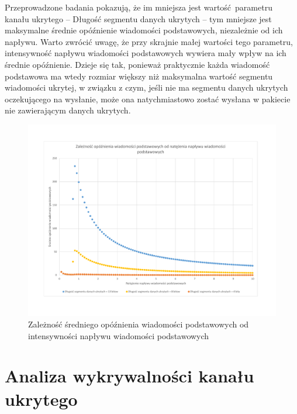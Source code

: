 \documentclass[a4paper, twoside, 12pt]{report}
\begin{document}
            Przeprowadzone badania pokazują, że im mniejsza jest wartość parametru
            kanału ukrytego -- Długość segmentu danych ukrytych -- tym mniejsze
            jest maksymalne średnie opóźnienie wiadomości podstawowych, niezależnie
            od ich napływu. Warto zwrócić uwagę, że przy skrajnie małej wartości tego
            parametru, intensywność napływu wiadomości podstawowych wywiera mały
            wpływ na ich średnie opóźnienie. Dzieje się tak, ponieważ praktycznie
            każda wiadomość podstawowa ma wtedy rozmiar większy niż maksymalna wartość
            segmentu wiadomości ukrytej, w związku z czym, jeśli nie ma segmentu
            danych ukrytych oczekującego na wysłanie, może ona natychmiastowo
            zostać wysłana w pakiecie nie zawierającym danych ukrytych.

        \begin{figure}[h]
                \centering
                \includegraphics[scale=0.6]{opoznieniepodstawowychodpodstawowych}
                \caption{Zależność średniego opóźnienia wiadomości podstawowych od
                    intensywności napływu wiadomości podstawowych}
                \label{OPOZNIENIEPODSTAWOWYCHODPODSTAWOWYCH}
        \end{figure}

\chapter{Analiza wykrywalności kanału ukrytego}
\end{document}

